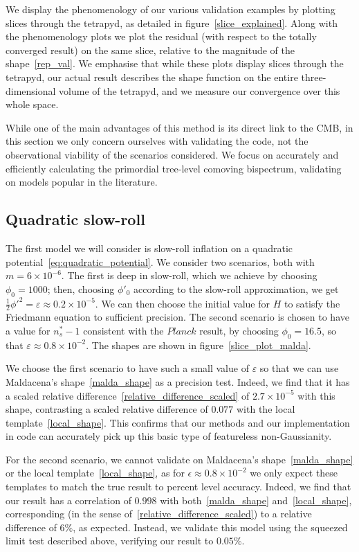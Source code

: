 We display the phenomenology of our various validation examples
by plotting slices through the tetrapyd, as detailed in figure~\ref{slice_explained}.
Along with the phenomenology plots we plot the residual
(with respect to the totally converged result)
on the same slice, relative to the magnitude of the shape~\eqref{rep_val}.
We emphasise that while these plots display slices through the
tetrapyd, our actual result describes the shape function on the
entire three-dimensional volume of the tetrapyd, and
we measure our convergence over this whole space.

While one of the main advantages of this method is its direct link
to the CMB, in this section we only concern ourselves with validating the
code, not the observational viability of the scenarios considered.
We focus on accurately and efficiently calculating the primordial
tree-level comoving bispectrum, validating on models popular in the
literature.
\subsection{Quadratic slow-roll}
The first model we will consider is slow-roll inflation
on a quadratic potential~\eqref{eq:quadratic_potential}.
We consider two scenarios, both with $m=6\times10^{-6}$.
The first is deep in slow-roll, which we achieve by choosing
$\phi_0=1000$; then, choosing $\phi'_0$ according to the
slow-roll approximation, we get
$\frac{1}{2}\phi'^2=\varepsilon\approx0.2\times10^{-5}$.
We can then choose the initial value for $H$ to
satisfy the Friedmann equation to sufficient precision.
The second scenario is chosen to have a value for $n_s^{*}-1$
consistent with the $\textit{Planck}$ result,
by choosing $\phi_0=16.5$, so that $\varepsilon\approx0.8\times10^{-2}$.
The shapes are shown in figure~\ref{slice_plot_malda}.


We choose the first scenario to have such a small value of $\varepsilon$
so that we can use Maldacena's shape~\eqref{malda_shape}
as a precision test.
Indeed, we find that it has a scaled relative difference~\eqref{relative_difference_scaled}
of $2.7\times10^{-5}$ with this shape,
contrasting a scaled relative difference
of $0.077$ with the local template~\eqref{local_shape}.
This confirms that our methods and our implementation in code can accurately
pick up this basic type of featureless non-Gaussianity.


For the second scenario, we cannot validate on
Maldacena's shape~\eqref{malda_shape} or the
local template~\eqref{local_shape},
as for $\epsilon\approx0.8\times10^{-2}$ we only expect
these templates to match the true result to percent level accuracy.
Indeed, we find that our result has a correlation of $0.998$
with both~\eqref{malda_shape} and~\eqref{local_shape},
corresponding (in the sense of~\eqref{relative_difference_scaled})
to a relative difference of $6\%$,
as expected.
Instead, we validate this model using
the squeezed limit test described above,
verifying our result to $0.05\%$.


